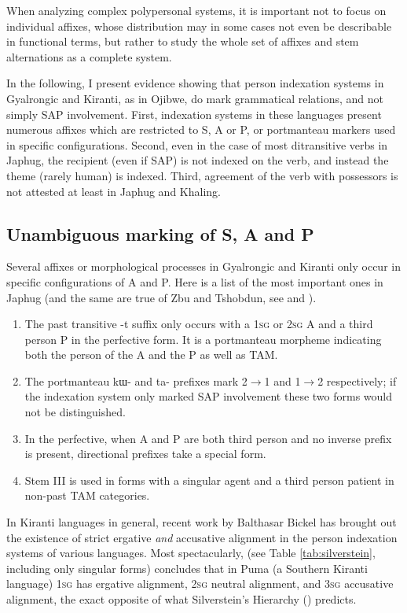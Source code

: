 \documentclass[oldfontcommands,oneside,a4paper,11pt]{article}
\newcommand{\ipa}[1]{{\phon \mbox{#1}}} %
\begin{document}
When analyzing complex polypersonal systems, it is important not to focus on individual affixes, whose distribution may in some cases not even be describable in functional terms, but rather to study the whole set of affixes and stem alternations as a complete system. 

In the following, I present evidence showing that person indexation systems in Gyalrongic and Kiranti, as in Ojibwe, do mark grammatical relations, and not simply SAP involvement. First, indexation systems in these languages present numerous affixes which are restricted to S, A or P, or portmanteau markers used in specific configurations. Second, even in the case of most ditransitive verbs in Japhug, the recipient (even if SAP) is not indexed on the verb, and instead the theme (rarely human) is indexed. Third, agreement of the verb with possessors is not attested at least in Japhug and Khaling.

\subsection{Unambiguous marking of S, A and P}
Several affixes or morphological processes in Gyalrongic and Kiranti only occur  in specific configurations of A and P. Here is a list of the most important ones in Japhug (and the same are true of Zbu and Tshobdun, see \citealt{jackson00sidaba, jackson02rentongdengdi} and \citealt{gongxun14agreement}).

\begin{enumerate}
\item The past transitive \ipa{-t} suffix only occurs with a \textsc{1sg} or \textsc{2sg} A and a third person P in the perfective form. It is a portmanteau morpheme indicating both the person of the A and the P as well as TAM.
\item The portmanteau \ipa{kɯ-} and \ipa{ta-} prefixes mark 2$\rightarrow$1 and 1$\rightarrow$2 respectively; if the indexation system only marked SAP involvement these two forms would not be distinguished.
\item In the perfective, when A and P are both third person and no inverse prefix is present, directional prefixes take a special form.
\item Stem III is used in forms with a singular agent and a third person patient in non-past TAM categories.
\end{enumerate}

In Kiranti languages in general, recent work by Balthasar Bickel has brought out the existence of strict ergative \textit{and} accusative alignment in the person indexation systems of various languages. Most spectacularly, \citet{bickel08scope} (see Table \ref{tab:silverstein}, including only singular forms) concludes that in Puma (a Southern Kiranti language) \textsc{1sg} has ergative alignment, \textsc{2sg} neutral alignment, and \textsc{3sg} accusative alignment, the exact opposite of what  Silverstein's Hierarchy (\citealt{silverstein76}) predicts.
\end{document}
